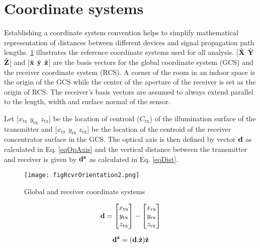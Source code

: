 \section{Coordinate systems}
\label{sec:coordinate}
\graphicspath{{_SISO/Figures/}}

Establishing a coordinate system convention helps to simplify mathematical representation of distances between different devices and signal propagation path lengths. \figurename{ \ref{fig:RcvrCoord}} illustrates the reference coordinate systems used for all analysis. [$\hat{\bf{X}}$ $\hat{\bf{Y}}$ $\hat{\bf{Z}}$] and [$\hat{\bf{x}}$ $\hat{\bf{y}}$ $\hat{\bf{z}}$] are the basis vectors for the global coordinate system (GCS) and the receiver coordinate system (RCS). A corner of the room in an indoor space is the origin of the GCS while the center of the aperture of the receiver is set as the origin of RCS. The receiver's basis vectors are assumed to always extend parallel to the length, width and surface normal of the sensor. 

Let [$x_{\text{tx}}$ $y_{\text{tx}}$ $z_{\text{tx}}$] be the location of centroid ($C_{\text{tx}}$) of the illumination surface of the transmitter and [$x_{\text{rx}}$ $y_{\text{rx}}$ $z_{\text{rx}}$] be the location of the centroid of the receiver concentrator surface in the GCS. The optical axis is then defined by vector ${\bf{d}}$ as calculated in Eq. \eqref{eqOpAxis} and the vertical distance between the transmitter and receiver is given by ${\bf{d}^{z}}$ as calculated in Eq. \eqref{eqDist}.

\begin{figure}[!t]
	\centering
		\texttt{[image: figRcvrOrientation2.png]}
	\caption{Global and receiver coordinate systems}
	\label{fig:RcvrCoord}
\end{figure}

\begin{equation}
\label{eqOpAxis}
	{\bf{d}}=\left[ \begin{matrix} x_{\text{tx}}\\ y_{\text{tx}}\\ z_{\text{tx}} \end{matrix} \right] - \left[ \begin{matrix} x_{\text{rx}}\\ y_{\text{rx}}\\ z_{\text{rx}} \end{matrix} \right]
\end{equation}

\begin{equation}
\label{eqDist}
	{\bf{d}^{z}}=({\bf{d}}.{\hat{\bf{z}}}){\hat{\bf{z}}}
\end{equation}

